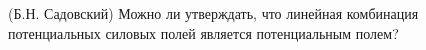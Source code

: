 (Б.Н. Садовский)
Можно ли утверждать, что линейная комбинация потенциальных силовых
полей является потенциальным полем?
